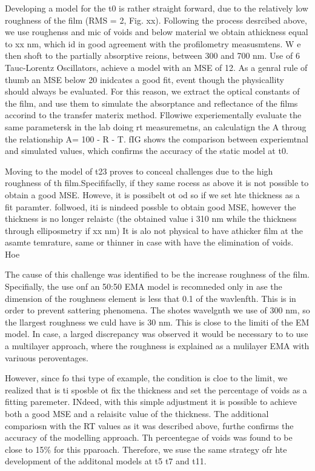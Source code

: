 Developing a model for the t0 is rather straight forward, due to the relatively low roughness of the film (RMS = 2, Fig. xx). Following the process desrcibed above, we use roughenss and mic of voids and below material we obtain athickness equal to xx nm, which id in good agreement with the profilometry measusmtens. W e then shoft to the partially absorptive reions, between 300 and 700 nm. Use of 6 Tauc-Lorentz Oscillators, achieve a model with an MSE of 12. As a genral rule of thumb an MSE below 20 inidcates a good fit, event though the physicallity should always be evaluated. For this reason, we extract the optical constants of the film, and use them to simulate the absorptance and reflectance of the films accorind to the transfer materix method. Fllowiwe experiementally evaluate the same parametersk in the lab doing rt measuremetns, an calculatign the A throug the relationship A= 100 - R - T. fIG shows the comparison between experiemtnal and simulated values, which confirms the accuracy of the static model at t0. 

Moving to the model of t23 proves to conceal challenges due to the high roughness of th film.Specififaclly, if they same rocess as above it is not possible to obtain a good MSE. Howeve, it is possibelt ot od so if we set hte thickness as a fit paramter. follwoed, iti is nindeed possble to obtain  good MSE, however the thickness is no longer relaistc (the obtained value i 310 nm while the thickness through elliposmetry if xx nm) It is alo not physical to have athicker film at the asamte temrature, same or thinner in case with have the elimination of voids. Hoe

The cause of this challenge was identified to be the increase roughness of the film. Specifially, the use onf an 50:50 EMA model is recomneded only in ase the dimension of the roughness element is less that 0.1 of the wavlenfth. This is in order to prevent sattering phenomena. The shotes wavelgnth we use of 300 nm, so the llargest roughness we culd have is 30 nm. This is close to the limiti of the EM model. In case, a larged discrepancy was observed it would be necessary to to use a multilayer approach, where the roughness is explained as a mulilayer EMA with variuous peroventages. 

However, since fo thsi type of example, the condition is cloe to the limit, we realized that is ti sposble ot fix the thickness and set the percentage of voids as a fitting paremeter. INdeed, with this simple adjustment it is possible to achieve both a good MSE and a relaisitc value of the thickness. The additional compariosn with the RT values as it was described above, furthe confirms the accuracy of the modelling approach. Th percentegae of voids was found to be close to 15\% for this pparoach. Therefore, we suse the same strategy ofr hte development of the additonal models at t5 t7 and t11. 


